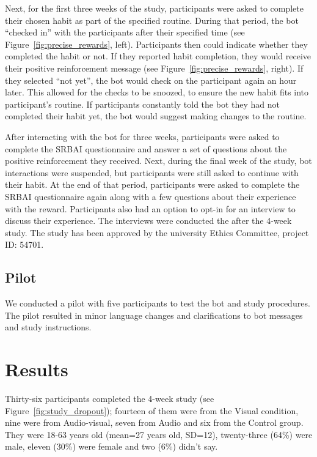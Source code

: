 \documentclass{scaffold/sigchi}
\begin{document}
Next, for the first three weeks of the study, participants were asked to complete their chosen habit as part of the specified routine. During that period, the bot ``checked in'' with the participants after their specified time (see Figure~\ref{fig:precise_rewards}, left). Participants then could indicate whether they completed the habit or not. If they reported habit completion, they would receive their positive reinforcement message (see Figure~\ref{fig:precise_rewards}, right). If they selected ``not yet'', the bot would check on the participant again an hour later. This allowed for the checks to be snoozed, to ensure the new habit fits into participant's routine. If participants constantly told the bot they had not completed their habit yet, the bot would suggest making changes to the routine.

After interacting with the bot for three weeks, participants were asked to complete the SRBAI questionnaire and answer a set of questions about the positive reinforcement they received. Next, during the final week of the study, bot interactions were suspended, but participants were still asked to continue with their habit. At the end of that period, participants were asked to complete the SRBAI questionnaire again along with a few questions about their experience with the reward. Participants also had an option to opt-in for an interview to discuss their experience. The interviews were conducted the after the 4-week study. The study has been approved by the university Ethics Committee, project ID: 54701.



\subsection{Pilot}
We conducted a pilot with five participants to test the bot and study procedures. The pilot resulted in minor language changes and clarifications to bot messages and study instructions.

\section{Results}
Thirty-six participants completed the 4-week study (see Figure~\ref{fig:study_dropout}); fourteen of them were from the Visual condition, nine were from Audio-visual, seven from Audio and six from the Control group. They were 18-63 years old (mean=27 years old, SD=12), twenty-three (64\%) were male, eleven (30\%) were female and two (6\%) didn't say. 
\end{document}
